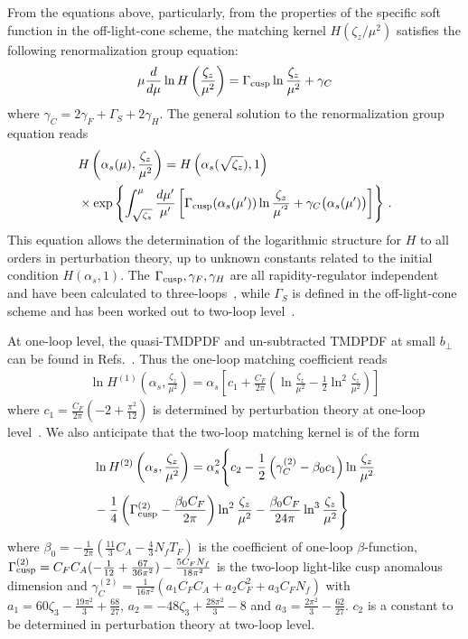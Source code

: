 \documentclass[twocolumn,aps,prd,preprintnumbers,superscriptaddress,10pt]{revtex4-1}
\begin{document}
From the equations above, particularly, from the properties of the specific soft function
in the off-light-cone scheme,
the matching kernel $H(\zeta_z/\mu^2)$ satisfies the following renormalization group equation:
\begin{align}
\mu\frac{d}{d\mu} \ln H\left(\frac{\zeta_z}{\mu^2}\right)=\Gamma_{\rm cusp} \ln \frac{\zeta_z}{\mu^2} + \gamma_C
\end{align}
where $\gamma_C=2\gamma_F + \Gamma_S +2\gamma_H $.
%
The general solution to the renormalization group equation reads
\begin{align}\label{eq:C_renormalization}
&H\left(\alpha_s(\mu),\frac{\zeta_z}{\mu^2}\right)=H\left(\alpha_s(\sqrt{\zeta_z}), 1\right)\\
&\times\exp\left\{\int_{\sqrt{\zeta_z}}^{\mu}\frac{d\mu'}{\mu'}\left[\Gamma_{\rm cusp}(\alpha_s(\mu')) \ln \frac{\zeta_z}{\mu^{'^2}}+\gamma_C\big(\alpha_s(\mu')\big)\right]\right\}\nonumber\,.
\end{align}
%
This equation allows the determination of the logarithmic structure for $H$ to all orders in perturbation theory, up to unknown constants related to the initial condition $H(\alpha_s,1)$.
%
The $\Gamma_{\rm cusp},\gamma_F,\gamma_H$ are all rapidity-regulator independent
and have been calculated to three-loops~\cite{Chetyrkin:2003vi,Luo:2019hmp,Grozin:2015kna}, while $\Gamma_S$
is defined in the off-light-cone scheme and has been worked out to two-loop level~\cite{Grozin:2015kna}.

At one-loop level, the quasi-TMDPDF and un-subtracted TMDPDF at small $b_\perp$ can be found in Refs.~\cite{Ji:2018hvs,Ebert:2019okf}.
Thus the one-loop matching coefficient reads
\begin{align}
\ln H^{(1)}\left(\alpha_s,\frac{\zeta_z}{\mu^2}\right) =\alpha_s\left[ c_1+\frac{C_F}{2\pi}\left(\ln\frac{\zeta_z}{\mu^2}-\frac{1}{2}\ln^2\frac{\zeta_z}{\mu^2}\right)\right]
\end{align}
where $c_1=\frac{C_F}{2\pi}\left(-2+\frac{\pi^2}{12}\right)$ is determined by perturbation theory at one-loop level~\cite{Ji:2018hvs,Ebert:2019okf}.
%
We also anticipate that the two-loop matching kernel is of the form
\begin{align}
&\ln H^{(2)}\left(\alpha_s,\frac{\zeta_z}{\mu^2}\right)=\alpha_s^2\Bigg\{c_2-\frac{1}{2}\left(\gamma^{(2)}_C-\beta_0 c_1\right)\ln\frac{\zeta_z}{\mu^2}\nonumber\\
&-\frac{1}{4}\left(\Gamma^{(2)}_{\rm cusp}-\frac{\beta_0 C_F}{2\pi}\right)\ln^2\frac{\zeta_z}{\mu^2}-\frac{\beta_0C_F}{24\pi}\ln^3\frac{\zeta_z}{\mu^2} \Bigg\}
\end{align}
where $\beta_0=-\frac{1}{2\pi}\left(\frac{11}{3}C_A-\frac{4}{3}N_f T_F\right)$ is the coefficient of one-loop $\beta$-function, $\Gamma^{(2)}_{\rm cusp}=C_FC_A(-\frac{1}{12}+\frac{67}{36\pi^2})-\frac{5C_FN_f}{18\pi^2}$ is the two-loop light-like cusp anomalous dimension and $\gamma_C^{(2)}=\frac{1}{16\pi^2}\left(a_1C_FC_A+a_2C_F^2+a_3C_FN_f\right)$ with $a_1=60 \zeta_3-\frac{19\pi ^2}{3}+\frac{68}{27}$, $a_2=-48 \zeta_3+\frac{28 \pi ^2}{3}-8$ and $a_3=\frac{2\pi ^2}{3}-\frac{62}{27}$. $c_2$ is a constant to be determined in perturbation theory at two-loop level.
\end{document}
